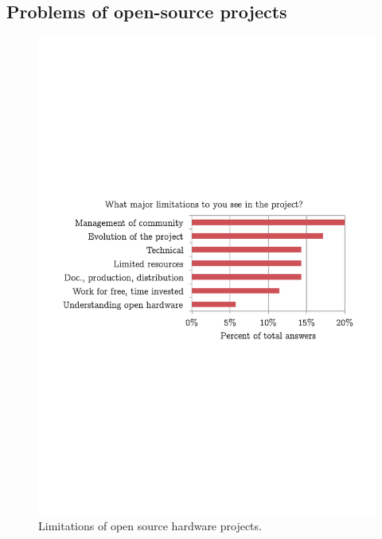 \documentclass[letterpaper, 10 pt, conference]{ieeeconf}  %
\begin{document}
\subsection{Problems of open-source projects}

\begin{figure}
\centering
\includegraphics[width=\columnwidth]{figures/limitations}
\caption{Limitations of open source hardware projects.}
\label{fig:problems}
\end{figure}
\end{document}
